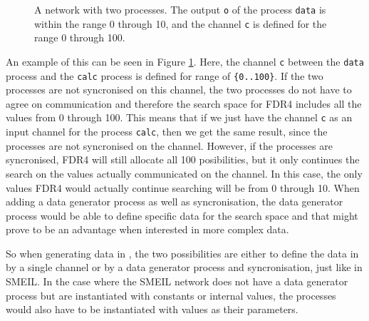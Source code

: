 \begin{figure}
    \centering
    \caption{A \cspm{} network with two processes. The output \texttt{o} of the process \texttt{data} is within the range 0 through 10, and the channel \texttt{c} is defined for the range 0 through 100.}
    \label{fig:csp_data_generator_process}
\end{figure}
An example of this can be seen in Figure \ref{fig:csp_data_generator_process}. Here, the channel \texttt{c} between the \texttt{data} process and the \texttt{calc} process is defined for range of \texttt{\{0..100\}}. If the two processes are not syncronised on this channel, the two processes do not have to agree on communication and therefore the search space for FDR4 includes all the values from 0 through 100. This means that if we just have the channel \texttt{c} as an input channel for the process \texttt{calc}, then we get the same result, since the processes are not syncronised on the channel.
However, if the processes are syncronised, FDR4 will still allocate all 100 posibilities, but it only continues the search on the values actually communicated on the channel. In this case, the only values FDR4 would actually continue searching will be from 0 through 10.
When adding a data generator process as well as syncronisation, the data generator process would be able to define specific data for the search space and that might prove to be an advantage when interested in more complex data.

So when generating data in \cspm{}, the two possibilities are either to define the data in \cspm by a single channel or by a data generator process and syncronisation, just like in SMEIL. In the case where the SMEIL network does not have a data generator process but are instantiated with constants or internal values, the \cspm processes would also have to be instantiated with values as their parameters.

